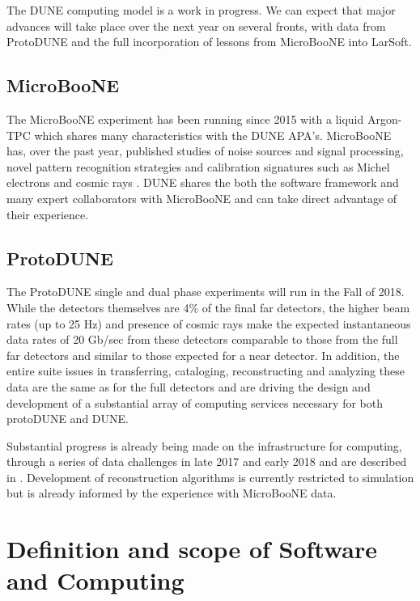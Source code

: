 The DUNE computing model is a work in progress.  We can expect that major advances will take place over the next year on several fronts, with data from ProtoDUNE and the full incorporation of lessons from MicroBooNE into LarSoft. 

\subsection{MicroBooNE}\label{sw:MB-input}

The MicroBooNE\cite{Acciarri:2016smi} experiment has been running since 2015 with a liquid Argon-TPC which shares many characteristics with the DUNE APA's.   MicroBooNE has, over the past year, published studies of noise sources and signal processing\cite{Acciarri:2017sde,Adams:2018dra}, novel pattern recognition strategies \cite{Acciarri:2016ryt,Acciarri:2017hat} and calibration signatures such as Michel electrons and cosmic rays \cite{Acciarri:2017sjy,Acciarri:2017sde}.  DUNE shares the both the \larsoft software framework and many expert collaborators with MicroBooNE and can take direct advantage of their experience. 

\subsection{ProtoDUNE}\label{sw:PD-planning}

The ProtoDUNE single and dual phase experiments will run in the Fall of 2018.  While the detectors themselves are 4\% of the final far detectors, the higher beam rates (up to 25 Hz) and presence of cosmic rays make the expected instantaneous data rates of 20 Gb/sec from these detectors comparable to those from the full far detectors and similar to those expected for a near detector. 
In addition, the entire suite issues in transferring, cataloging, reconstructing and analyzing these data are the same as for the full detectors and are driving the design and development of a substantial array of computing services necessary for both protoDUNE and DUNE.

Substantial progress is already being made on the infrastructure for computing, through a series of data challenges in late 2017 and early 2018 and are described in 
.  Development of reconstruction algorithms is currently restricted to simulation but is already informed by the experience with MicroBooNE data.


\section{Definition and scope of Software and Computing}

